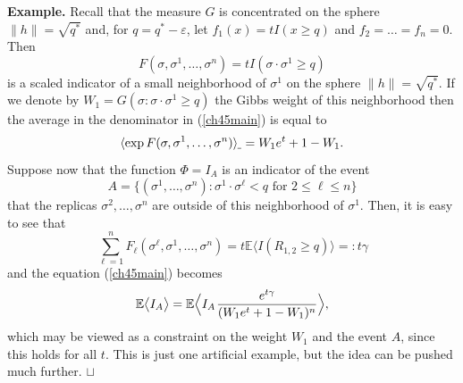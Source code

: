 \documentclass[12pt]{article}
\newcommand{\eps}{{\varepsilon}}
\newcommand{\smsp}{\hspace{0.3mm}}
\newcommand{\e}{\mathbb{E}}
\newcommand{\la}{\langle}
\newcommand{\ra}{\rangle}
\newcommand\qed{\hfill\hbox{\rlap{$\sqcap$}$\sqcup$}}
\theoremstyle{nonumberplain}
\begin{document}
\medskip
\noindent
\textbf{Example.}
Recall that the measure $G$ is concentrated on the sphere $\|h\|=\sqrt{q^*}$ and, for $q=q^*-\eps$, let $f_1(x) = t I(x \geq q)$ and $f_2 = \ldots = f_n =0.$ Then
$$
F(\sigma,\sigma^1,\ldots,\sigma^n) = t I(\sigma \cdot \sigma^1 \geq q)
$$
is a scaled indicator of a small neighborhood of $\sigma^1$ on the sphere $\|h\|=\sqrt{q^*}$. If we denote by $W_1 = G(\sigma : \sigma \cdot \sigma^1 \geq q)$ the Gibbs weight of this neighborhood then the average in the denominator in (\ref{ch45main}) is equal to
$$
\la\exp F(\sigma,\sigma^1,\ldots,\sigma^n)\ra_{\hspace{-0.3mm}\mathunderscore}
=
W_1 e^t + 1-W_1.
$$
Suppose now that the function $\Phi = I_A$ is an indicator of the event 
$$
A = \bigl\{(\sigma^1,\ldots, \sigma^n) : \sigma^1 \cdot \sigma^{\ell} <q \mbox{ for } 2\leq \ell\leq n \bigr\}
$$
that the replicas $\sigma^2,\ldots,\sigma^n$ are outside of this neighborhood of $\sigma^1$. Then, it is easy to see that
$$
\sum_{\ell=1}^{n} F_{\ell}(\sigma^{\ell},\sigma^1,\ldots,\sigma^n)
=
t \e \la I(R_{1,2} \geq q)\ra
= : t\gamma
$$
and the equation (\ref{ch45main}) becomes
\begin{equation}
\e \bigl\la I_A \bigr \ra =
\e\Bigl\la
I_A \smsp
\frac{e^{t\gamma}}
{(W_1 e^t + 1-W_1)^n}
\Bigr\ra,
\label{ch45mainEx}
\end{equation}
which may be viewed as a constraint on the weight $W_1$ and the event $A$, since this holds for all $t$. This is just one artificial example, but the idea can be pushed much further.
\qed
\end{document}
